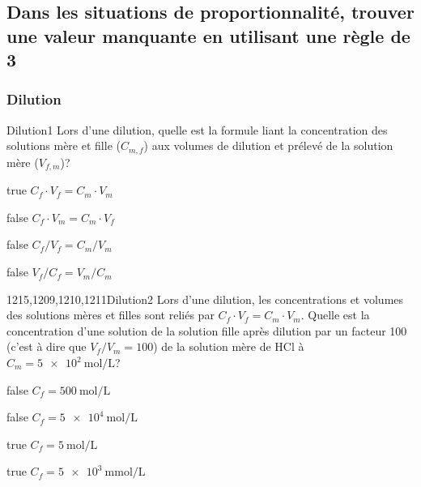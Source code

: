 \documentclass[11pt]{article}
\begin{document}
    
    \subsection{Dans les situations de proportionnalité, trouver une valeur manquante en utilisant une règle de 3}
		\subsubsection{Dilution}
			\begin{question}{}{Dilution}{1}{}
				Lors d'une dilution, quelle est la formule liant la concentration des solutions mère et fille ($C_{m,f}$) aux volumes de dilution et prélevé de la solution mère ($V_{f,m}$)?
			\end{question}
			\begin{reponses}
				\item[true] $C_f\cdot V_f = C_m\cdot V_m$
				\item[false] $C_f\cdot V_m = C_m\cdot V_f$
				\item[false] $C_f/V_f = C_m/V_m$
				\item[false] $V_f/C_f = V_m/C_m$
			\end{reponses}
		
			\begin{question}{1215,1209,1210,1211}{Dilution}{2}{}
				Lors d'une dilution, les concentrations et volumes des solutions mères et filles sont reliés par $C_f\cdot V_f = C_m\cdot V_m$. Quelle est la concentration d'une solution de la solution fille après dilution par un facteur 100 (c'est à dire que $V_f/V_m = 100$) de la solution mère de HCl à $C_m = \SI{5e2}{\mole\per\liter}$?
			\end{question}
			\begin{reponses}
				\item[false] $C_f = \SI{500}{\mole\per\liter}$
				\item[false] $C_f = \SI{5e4}{\mole\per\liter}$
				\item[true] $C_f = \SI{5}{\mole\per\liter}$
				\item[true] $C_f = \SI{5e3}{\milli\mole\per\liter}$
			\end{reponses}
			
\end{document}
